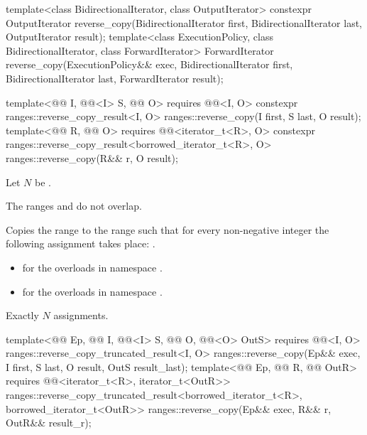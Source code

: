%
\begin{itemdecl}
template<class BidirectionalIterator, class OutputIterator>
  constexpr OutputIterator
    reverse_copy(BidirectionalIterator first, BidirectionalIterator last,
                 OutputIterator result);
template<class ExecutionPolicy, class BidirectionalIterator, class ForwardIterator>
  ForwardIterator
    reverse_copy(ExecutionPolicy&& exec,
                 BidirectionalIterator first, BidirectionalIterator last,
                 ForwardIterator result);

template<@@ I, @@<I> S, @@ O>
  requires @@<I, O>
  constexpr ranges::reverse_copy_result<I, O>
    ranges::reverse_copy(I first, S last, O result);
template<@@ R, @@ O>
  requires @@<iterator_t<R>, O>
  constexpr ranges::reverse_copy_result<borrowed_iterator_t<R>, O>
    ranges::reverse_copy(R&& r, O result);
\end{itemdecl}

\begin{itemdescr}
\pnum
Let $N$ be .

\pnum
\expects
The ranges  and 
do not overlap.

\pnum
\effects
Copies the range  to the range 
such that for every non-negative integer 
the following assignment takes place:
.

\pnum
\returns
\begin{itemize}
\item
   for the overloads in namespace .
\item
   for the overloads in namespace .
\end{itemize}

\pnum
\complexity
Exactly $N$ assignments.
\end{itemdescr}

\begin{itemdecl}
template<@@ Ep, @@ I, @@<I> S,
         @@ O, @@<O> OutS>
  requires @@<I, O>
  ranges::reverse_copy_truncated_result<I, O>
    ranges::reverse_copy(Ep&& exec, I first, S last, O result,
                         OutS result_last);
template<@@ Ep, @@ R, @@ OutR>
  requires @@<iterator_t<R>, iterator_t<OutR>>
  ranges::reverse_copy_truncated_result<borrowed_iterator_t<R>, borrowed_iterator_t<OutR>>
    ranges::reverse_copy(Ep&& exec, R&& r, OutR&& result_r);
\end{itemdecl}

